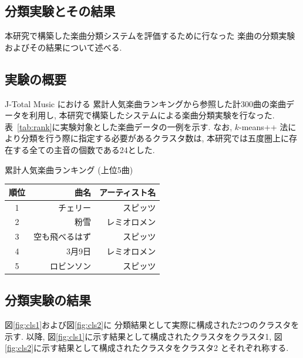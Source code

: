 \documentclass{jpreprint}
\begin{document}
\begin{multicols}{2}
\section{分類実験とその結果}
本研究で構築した楽曲分類システムを評価するために行なった
楽曲の分類実験およびその結果について述べる.

\subsection{実験の概要}
J-Total Music における
累計人気楽曲ランキングから参照した計300曲の楽曲データを利用し,
本研究で構築したシステムによる楽曲分類実験を行なった.
表~\ref{tab:rank}に実験対象とした楽曲データの一例を示す.
なお, 
$k$-means++ 法により分類を行う際に指定する必要があるクラスタ数は,
本研究では五度圏上に存在する全ての主音の個数である24とした.

\begin{tablehere}
  \begin{center}
  \caption{累計人気楽曲ランキング (上位5曲)}
  \label{tab:rank}
  \begin{tabular}{c|r|r}
    \hline
    \hline
    順位 & 曲名 & アーティスト名 \\
    \hline
    1 & チェリー & スピッツ \\
    2 & 粉雪 & レミオロメン \\
    3 & 空も飛べるはず & スピッツ \\
    4 & 3月9日 & レミオロメン \\
    5 & ロビンソン & スピッツ \\
    \hline
    \hline
  \end{tabular}
  \end{center}
\end{tablehere}

\subsection{分類実験の結果}
図\ref{fig:cls1}および図\ref{fig:cls2}に
分類結果として実際に構成された2つのクラスタを示す.
以降,
図\ref{fig:cls1}に示す結果として構成されたクラスタをクラスタ1,
図\ref{fig:cls2}に示す結果として構成されたクラスタをクラスタ2
とそれぞれ称する.


\end{multicols}
\end{document}

